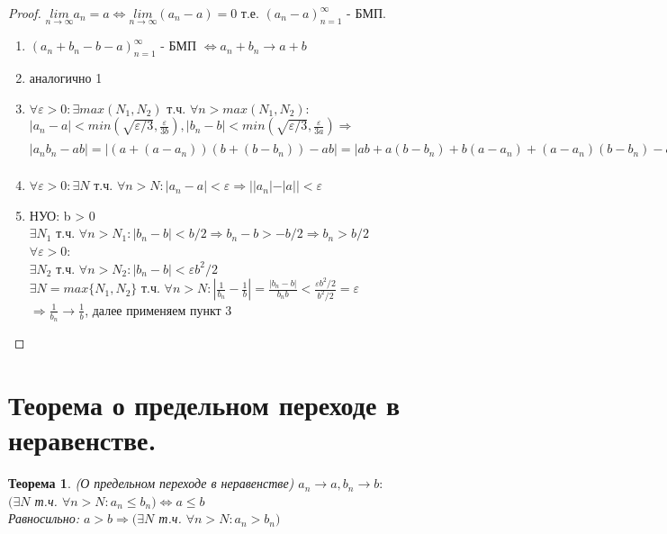 \documentclass[11pt,a4paper,titlepage]{article}
\newtheorem*{theorem}{Теорема}
\renewcommand{\lim}[2]{\underset{#1 \rightarrow #2}{lim}}
\newcommand{\limn}{\lim{n}{\infty}}
\renewcommand{\implies}{\Rightarrow}
\renewcommand{\iff}{\Leftrightarrow}
\renewcommand{\epsilon}{\varepsilon}
\begin{document}
    \begin{proof}
        $\limn a_n = a \iff \limn (a_n - a) = 0$ т.е. $(a_n - a)_{n=1}^\infty$ - БМП.
        \begin{enumerate}
            \item $(a_n + b_n - b - a)_{n=1}^\infty$ - БМП $\iff a_n + b_n \to a+b$
            \item аналогично 1
            \item $\forall \epsilon > 0: \exists max(N_1, N_2)$ т.ч. $\forall n > max(N_1, N_2):$\\
            $|a_n-a| < min(\sqrt{\epsilon/3},\frac{\epsilon}{3b}), |b_n-b| < min(\sqrt{\epsilon/3},\frac{\epsilon}{3a}) \implies$\\
            $|a_n b_n - ab| = |(a+(a-a_n))(b+(b-b_n))-ab|=|ab+a(b-b_n)+b(a-a_n)+(a-a_n)(b-b_n)-ab|\leq|a(b-b_n)|+|b(a-a_n)|+|(a-a_n)(b-b_n)| < |\frac{\epsilon a}{3a}| + |\frac{\epsilon b}{3b}| + |\sqrt{\epsilon/3}^2| = \epsilon$
            \item $\forall \epsilon > 0: \exists N$ т.ч. $\forall n > N: |a_n - a| < \epsilon \implies ||a_n|-|a|| < \epsilon$
            \item НУО: b > 0\\
            $\exists N_1$ т.ч. $\forall n > N_1: |b_n - b| < b/2 \implies b_n - b > -b/2 \implies b_n > b/2$\\
            $\forall \epsilon > 0$:\\
            $\exists N_2$ т.ч. $\forall n > N_2: |b_n - b| < \epsilon b^2/2$\\
            $\exists N = max\{N_1, N_2\}$ т.ч. $\forall n > N: |\frac{1}{b_n}-\frac{1}{b}|=\frac{|b_n-b|}{b_n b} < \frac{\epsilon b^2/2}{b^2/2}=\epsilon$\\
            $\implies \frac{1}{b_n} \to \frac{1}{b}$, далее применяем пункт 3

        \end{enumerate}
    \end{proof}


    \section{Теорема о предельном переходе в неравенстве.}

    \begin{theorem}
        (О предельном переходе в неравенстве)
        $a_n \to a, b_n \to b:$\\
        $(\exists N$ т.ч. $\forall n > N: a_n \leq b_n) \iff a \leq b$ \\
        Равносильно: $a > b \implies (\exists N$ т.ч. $\forall n > N: a_n > b_n)$
    \end{theorem}
\end{document}
